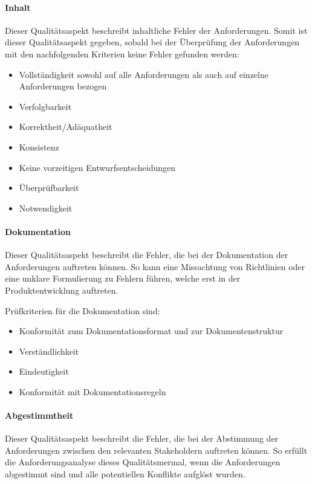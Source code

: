 \paragraph{Inhalt}
Dieser Qualitätsaspekt beschreibt inhaltliche Fehler der Anforderungen.
Somit ist dieser Qualitätsaspekt gegeben, sobald bei der Überprüfung der Anforderungen mit den nachfolgenden Kriterien keine Fehler gefunden werden:
\begin{itemize}
    \item Vollständigkeit sowohl auf alle Anforderungen als auch auf einzelne Anforderungen bezogen
    \item Verfolgbarkeit
    \item Korrektheit/Adäquatheit
    \item Konsistenz
    \item Keine vorzeitigen Entwurfsentscheidungen
    \item Überprüfbarkeit
    \item Notwendigkeit
\end{itemize}\autocite[vgl.][Seite 19f]{Maulhardt.c}

\paragraph{Dokumentation}
Dieser Qualitätsaspekt beschreibt die Fehler, die bei der Dokumentation der Anforderungen auftreten können.
So kann eine Missachtung von Richtlinien oder eine unklare Formulierung zu Fehlern führen, welche erst in der Produktentwicklung auftreten.

Prüfkriterien für die Dokumentation sind:
\begin{itemize}
    \item Konformität zum Dokumentationsformat und zur Dokumentenstruktur
    \item Verständlichkeit
    \item Eindeutigkeit
    \item Konformität mit Dokumentationsregeln
\end{itemize}\autocite[vgl.][Seite 21ff]{Maulhardt.c}

\paragraph{Abgestimmtheit}
Dieser Qualitätsaspekt beschreibt die Fehler, die bei der Abstimmung der Anforderungen zwischen den relevanten Stakeholdern auftreten können.
So erfüllt die Anforderungsanalyse dieses Qualitätsmermal, wenn die Anforderungen abgestimmt sind und alle potentiellen Konflikte aufglöst wurden\autocite[vgl.][Seite 24]{Maulhardt.c}.


